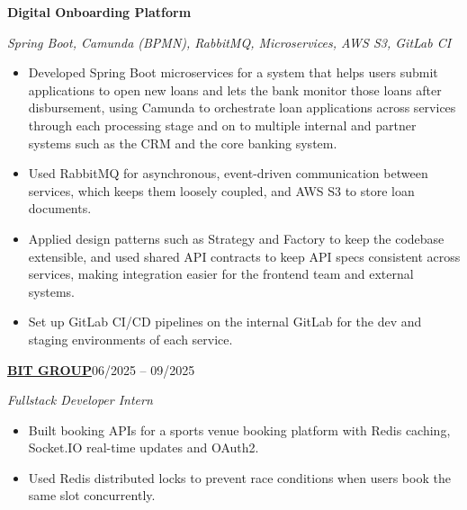 \documentclass[11pt,a4paper]{article}
\newcommand{\divider}{\vspace{8pt}{\color{divider}\rule{\textwidth}{0.5pt}}\vspace{4pt}}
\newcommand{\entry}[3]{%
  \textbf{#1}\hfill #2\par\vspace{3pt}
  {\itshape\color{subtle}#3}\par\vspace{1pt}}
\newcommand{\company}[3]{\href{#2}{#1}\normalfont{\small\color{subtle}\quad\href{#2}{#3}}}
\newcommand{\project}[2]{\textbf{#1}\par{\small\itshape\color{subtle}#2}\par}
\begin{document}
\project{Digital Onboarding Platform}{Spring Boot, Camunda (BPMN), RabbitMQ, Microservices, AWS S3, GitLab CI}
\begin{itemize}
  \item Developed Spring Boot microservices for a system that helps users submit applications to open new loans and lets the bank monitor those loans after disbursement, using Camunda to orchestrate loan applications across services through each processing stage and on to multiple internal and partner systems such as the CRM and the core banking system.
  \item Used RabbitMQ for asynchronous, event-driven communication between services, which keeps them loosely coupled, and AWS S3 to store loan documents.
  \item Applied design patterns such as Strategy and Factory to keep the codebase extensible, and used shared API contracts to keep API specs consistent across services, making integration easier for the frontend team and external systems.
  \item Set up GitLab CI/CD pipelines on the internal GitLab for the dev and staging environments of each service.
\end{itemize}
\divider

\entry{\company{BIT GROUP}{https://bit.com.vn/}{bit.com.vn}}{06/2025 -- 09/2025}{Fullstack Developer Intern}
\begin{itemize}
  \item Built booking APIs for a sports venue booking platform with Redis caching, Socket.IO real-time updates and OAuth2.
  \item Used Redis distributed locks to prevent race conditions when users book the same slot concurrently.
\end{itemize}
\endgroup

\pagebreak
\end{document}
